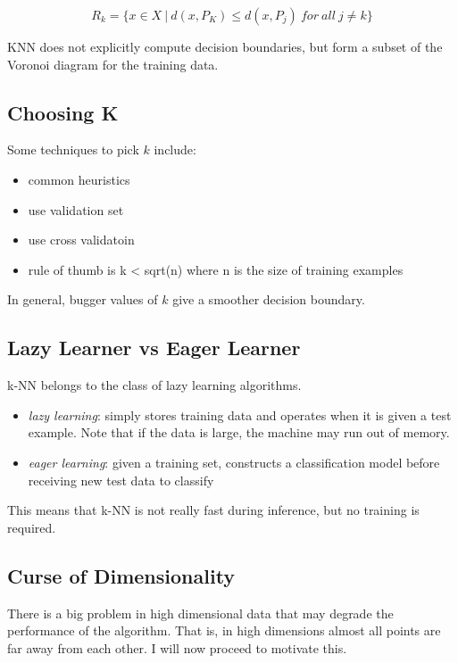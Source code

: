 \documentclass{article}
\begin{document}
\[R_k = \{ x\in X\ |\ d(x, P_K)\le d(x, P_j)\ for\ all\ j\ne k  \}\]

KNN does not explicitly compute decision boundaries, but form a subset
of the Voronoi diagram for the training data.

\subsection{Choosing K}\label{choosing-k}

Some techniques to pick \(k\) include:

\begin{itemize}
\tightlist
\item
  common heuristics
\item
  use validation set
\item
  use cross validatoin
\item
  rule of thumb is k \textless{} sqrt(n) where n is the size of training
  examples
\end{itemize}

In general, bugger values of \(k\) give a smoother decision boundary.

\subsection{Lazy Learner vs Eager
Learner}\label{lazy-learner-vs-eager-learner}

k-NN belongs to the class of lazy learning algorithms.

\begin{itemize}
\tightlist
\item
  \emph{lazy learning}: simply stores training data and operates when it
  is given a test example. Note that if the data is large, the machine
  may run out of memory.
\item
  \emph{eager learning}: given a training set, constructs a
  classification model before receiving new test data to classify
\end{itemize}

This means that k-NN is not really fast during inference, but no
training is required.

\subsection{Curse of Dimensionality}\label{curse-of-dimensionality}

There is a big problem in high dimensional data that may degrade the
performance of the algorithm. That is, in high dimensions almost all
points are far away from each other. I will now proceed to motivate
this.
\end{document}
